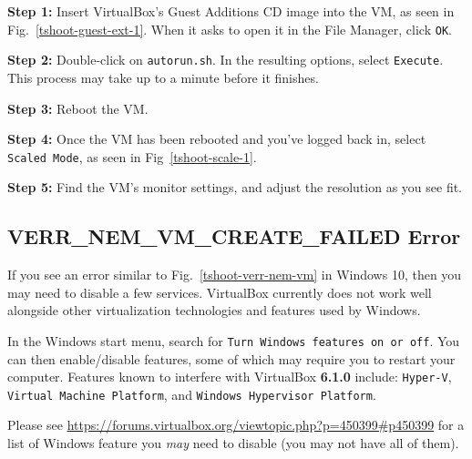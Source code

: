 \documentclass[11pt]{article}
\begin{document}
\textbf{Step 1:} Insert VirtualBox's Guest Additions CD image into the VM, as seen in Fig.~\ref{tshoot-guest-ext-1}. When it asks to open it in the File Manager, click \texttt{OK}.

\textbf{Step 2:} Double-click on \texttt{autorun.sh}. In the resulting options, select \texttt{Execute}. This process may take up to a minute before it finishes.

\textbf{Step 3:} Reboot the VM.

\textbf{Step 4:} Once the VM has been rebooted and you've logged back in, select \texttt{Scaled Mode}, as seen in Fig~\ref{tshoot-scale-1}.

\textbf{Step 5:} Find the VM's monitor settings, and adjust the resolution as you see fit.


\subsection{VERR\_NEM\_VM\_CREATE\_FAILED Error}
If you see an error similar to Fig.~\ref{tshoot-verr-nem-vm} in Windows 10, then you may need to disable a few services. VirtualBox currently does not work well alongside other virtualization technologies and features used by Windows.

In the Windows start menu, search for \texttt{Turn Windows features on or off}. You can then enable/disable features, some of which may require you to restart your computer. Features known to interfere with VirtualBox \textbf{6.1.0} include: \texttt{Hyper-V}, \texttt{Virtual Machine Platform}, and \texttt{Windows Hypervisor Platform}.

Please see \url{https://forums.virtualbox.org/viewtopic.php?p=450399#p450399} for a list of Windows feature you \textit{may} need to disable (you may not have all of them).

\end{document}

